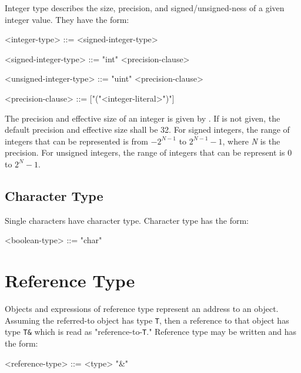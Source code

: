 Integer type describes the size, precision, and signed/unsigned-ness of a given integer value. They have the form:

\begin{minip}
\begin{grammar}
<integer-type> ::= <signed-integer-type>

<signed-integer-type> ::= "int" <precision-clause>

<unsigned-integer-type> ::= "uint" <precision-clause>

<precision-clause> ::= ["("<integer-literal>")"]
\end{grammar}
\end{minip}

The precision and effective size of an integer is given by . If  is not given, the default precision and effective size shall be 32. For signed integers, the range of integers that can be represented is from $-2^{N-1}$ to $2^{N-1}-1$, where \textit{N} is the precision. For unsigned integers, the range of integers that can be represent is $0$ to $2^{N}-1$.

\subsection{Character Type} \label{guide:char_type}

Single characters have character type. Character type has the form: 

\begin{minip}
\begin{grammar}
<boolean-type> ::= "char"
\end{grammar}
\end{minip}

\section{Reference Type} \label{guide:ref_type}

Objects and expressions of reference type represent an address to an object. Assuming the referred-to object has type \texttt{T}, then a reference to that object has type \texttt{T\&} which is read as "reference-to-\texttt{T}." Reference type may be written and has the form:

\begin{minip}
\begin{grammar}
<reference-type> ::= <type> "\&" 
\end{grammar}
\end{minip}

